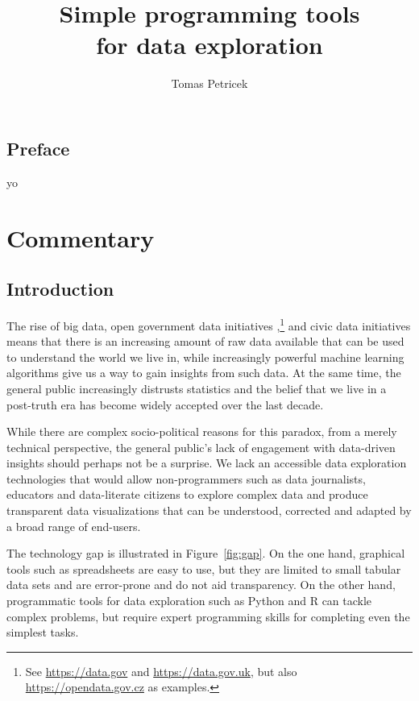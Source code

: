 \documentclass[fleqn,11pt]{report}
\begin{document}
\title{\Huge\textbf{Simple programming tools \\for data exploration}}
\author{Tomas Petricek}
\maketitle

\chapter*{Preface}
\label{ch:preface}

yo

\tableofcontents

\part{Commentary}

\chapter{Introduction}

The rise of big data, open government data initiatives \citep{attard-2015-opengov},\footnote{See
\url{https://data.gov} and \url{https://data.gov.uk}, but also \url{https://opendata.gov.cz} as
examples.} and civic data initiatives means that there is an increasing amount of raw data available
that can be used to understand the world we live in, while increasingly powerful machine learning
algorithms give us a way to gain insights from such data. At the same time, the general
public increasingly distrusts statistics \citep{davies-2017-statistics} and the belief that we
live in a post-truth era has become widely accepted over the last decade.

While there are complex socio-political reasons for this paradox, from a merely technical
perspective, the general public's lack of engagement with data-driven insights should perhaps
not be a surprise. We lack an accessible data exploration technologies that would allow
non-programmers such as data journalists, educators and data-literate citizens to explore complex
data and produce transparent data visualizations that can be understood, corrected and adapted by
a broad range of end-users.

The technology gap is illustrated in Figure~\ref{fig:gap}. On the one hand, graphical tools such as
spreadsheets are easy to use, but they are limited to small tabular data sets and are error-prone
\citep{panko-2015-errors} and do not aid transparency. On the other hand, programmatic tools for
data exploration such as Python and R can tackle complex problems, but require expert programming
skills for completing even the simplest tasks.
\end{document}
